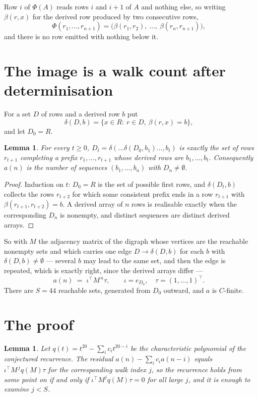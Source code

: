 \documentclass[11pt,a4paper]{article}
\theoremstyle{plain}
\newtheorem{lemma}[theorem]{Lemma}
\theoremstyle{definition}
\begin{document}
Row $i$ of $\Phi(A)$ reads rows $i$ and $i+1$ of $A$ and nothing else, so
writing $\beta(r,x)$ for the derived row produced by two consecutive rows,
\[
\Phi(r_1,\dots,r_{n+1})=\bigl(\beta(r_1,r_2),\ \dots,\ \beta(r_n,r_{n+1})\bigr),
\]
and there is no row emitted with nothing below it.

\section{The image is a walk count after determinisation}

For a set $D$ of rows and a derived row $b$ put
\[
\delta(D,b)=\{x\in R:\ r\in D,\ \beta(r,x)=b\},
\]
and let $D_0=R$.

\begin{lemma}\label{lem:det}
For every $t\ge0$, $D_t=\delta(\dots\delta(D_0,b_1)\dots,b_t)$ is exactly the set of rows
$r_{t+1}$ completing a prefix $r_1,\dots,r_{t+1}$ whose derived rows are $b_1,\dots,b_t$.
Consequently $a(n)$ is the number of sequences $(b_1,\dots,b_n)$ with $D_n\neq\emptyset$.
\end{lemma}

\begin{proof}
Induction on $t$: $D_0=R$ is the set of possible first rows, and $\delta(D_t,b)$ collects the
rows $r_{t+2}$ for which some consistent prefix ends in a row $r_{t+1}$ with
$\beta(r_{t+1},r_{t+2})=b$. A derived array of $n$ rows is realisable exactly when the
corresponding $D_n$ is nonempty, and distinct sequences are distinct derived arrays.
\end{proof}

So with $M$ the adjacency matrix of the digraph whose vertices are the reachable nonempty sets
and which carries one edge $D\to\delta(D,b)$ for each $b$ with $\delta(D,b)\neq\emptyset$ ---
several $b$ may lead to the same set, and then the edge is repeated, which is exactly right,
since the derived arrays differ ---
\[
a(n)\;=\;\iota^{\!\top}M^{\,n}\tau,\qquad \iota=e_{D_0},\quad \tau=(1,\dots,1)^{\!\top} .
\]
There are $S=44$ reachable sets, generated from $D_0$ outward, and $a$ is $C$-finite.


\section{The proof}

\begin{lemma}\label{lem:crit}
Let $q(t)=t^{20}-\sum_i c_it^{20-i}$ be the characteristic polynomial of the
conjectured recurrence. The residual $a(n)-\sum_ic_ia(n-i)$ equals
$\iota^{\!\top}M^{\,j}q(M)\tau$ for the corresponding walk index $j$, so the recurrence
holds from some point on if and only if $\iota^{\!\top}M^{j}q(M)\tau=0$ for all large $j$,
and it is enough to examine $j<S$.
\end{lemma}
\end{document}

